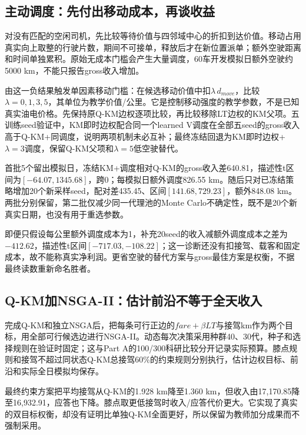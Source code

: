 \subsection{主动调度：先付出移动成本，再谈收益}
对没有匹配的空闲司机，先比较等待价值与四邻域中心的折扣到达价值。移动占用真实向上取整的行驶片数，期间不可接单，释放后才在新位置派单；额外空驶距离和时间单独累积。原始无成本门槛会产生大量调度，60车开发模拟日额外空驶约5000 km，不能只报告gross收入增加。

由这一负结果触发单因素移动门槛：在候选移动价值中扣$\lambda\,d_{move}$，比较$\lambda=0,1,3,5$，其单位为教学价值/公里。它是控制移动强度的教学参数，不是已知真实油电价格。先保持原Q-KM边权逐项比较，再比较移除LT边权的KM父项。五训练seed验证中，KM即时边权配合同一个learned V调度在全部五seed的gross收入高于Q-KM+同调度，说明两项机制未必互补；最终冻结回退为KM即时边权+$\lambda=3$调度，保留Q-KM父项和$\lambda=5$低空驶替代。



首批5个留出模拟日，冻结KM+调度相对Q-KM的gross收入差640.81，描述性t区间为$[-64.07,1345.68]$，跨0；每模拟日额外调度826.55 km。随后只对已冻结策略增加20个新采样seed，配对差435.45、区间$[141.68,729.23]$，额外848.08 km。两批分别保留，第二批仅减少同一代理池的Monte Carlo不确定性，既不是20个新真实日期，也没有用于重选参数。

即便只假设每公里额外调度成本为1，补充20seed的收入减额外调度成本之差为$-412.62$，描述性t区间$[-717.03,-108.22]$；这一诊断还没有扣接驾、载客和固定成本，故不能称真实净利润。更省空驶的替代方案与gross最佳方案是权衡，不据最终读数重新命名胜者。


\subsection{Q-KM加NSGA-II：估计前沿不等于全天收入}
完成Q-KM和独立NSGA后，把每条可行正边的$fare+\beta LT$与接驾km作为两个目标，用全部可行候选边进行NSGA-II。动态每次决策采用种群40、30代，种子和选择规则在验证时固定；这与Part A的100/300科研比较分开记录实际预算。膝点规则和接驾不超过同状态Q-KM总接驾60\%的约束规则分别执行，估计边权目标、前沿和实际全日模拟均保存。

最终约束方案把平均接驾从Q-KM的1.928 km降至1.360 km，但收入由17,170.85降至16,932.91，应答也下降。膝点取更低接驾时收入/应答代价更大。它实现了真实的双目标权衡，却没有证明比单独Q-KM全面更好，所以保留为教师加分成果而不强制采用。
